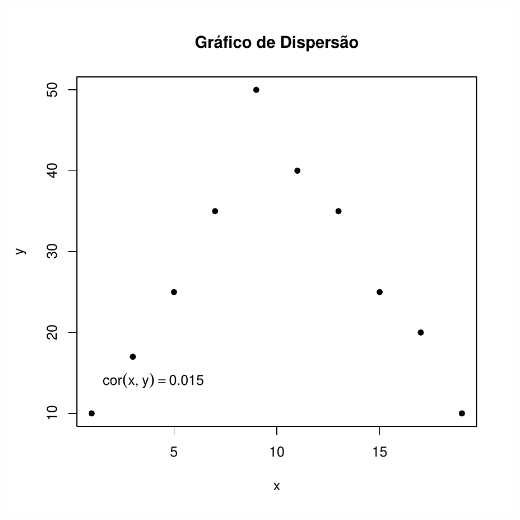 \documentclass[14pt,aspectratio=1610]{beamer}
\begin{document}
\begin{frame}[fragile]{}
\begin{center}
\includegraphics{Aula3-006}
\end{center}
\end{frame}
\end{document}
